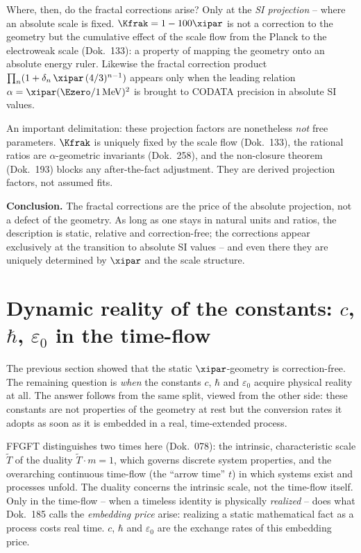 Where, then, do the fractal corrections arise? Only at the \emph{SI projection} --
where an absolute scale is fixed. $\Kfrak=1-100\xipar$ is not a correction to the
geometry but the cumulative effect of the scale flow from the Planck to the
electroweak scale (Dok.~133): a property of mapping the geometry onto an absolute
energy ruler. Likewise the fractal correction product
$\prod_n(1+\delta_n\,\xipar\,(4/3)^{n-1})$ appears only when the leading relation
$\alpha=\xipar(\Ezero/1\,\mathrm{MeV})^2$ is brought to CODATA precision in absolute
SI values.

An important delimitation: these projection factors are nonetheless \emph{not}
free parameters. $\Kfrak$ is uniquely fixed by the scale flow (Dok.~133), the
rational ratios are $\alpha$-geometric invariants (Dok.~258), and the non-closure
theorem (Dok.~193) blocks any after-the-fact adjustment. They are derived
projection factors, not assumed fits.

\begin{result}
\textbf{Conclusion.} The fractal corrections are the price of the absolute
projection, not a defect of the geometry. As long as one stays in natural units
and ratios, the description is static, relative and correction-free; the
corrections appear exclusively at the transition to absolute SI values -- and even
there they are uniquely determined by $\xipar$ and the scale structure.
\end{result}

\section{Dynamic reality of the constants: $c$, $\hbar$, $\varepsilon_0$ in the time-flow}
\label{sec:dyn-konstanten}

The previous section showed that the static $\xipar$-geometry is correction-free.
The remaining question is \emph{when} the constants $c$, $\hbar$ and
$\varepsilon_0$ acquire physical reality at all. The answer follows from the same
split, viewed from the other side: these constants are not properties of the
geometry at rest but the conversion rates it adopts as soon as it is embedded in a
real, time-extended process.

FFGFT distinguishes two times here (Dok.~078): the intrinsic, characteristic scale
$\tilde T$ of the duality $\tilde T\cdot m=1$, which governs discrete system
properties, and the overarching continuous time-flow (the ``arrow time'' $t$) in
which systems exist and processes unfold. The duality concerns the intrinsic
scale, not the time-flow itself. Only in the time-flow -- when a timeless identity
is physically \emph{realized} -- does what Dok.~185 calls the \emph{embedding
price} arise: realizing a static mathematical fact as a process costs real time.
$c$, $\hbar$ and $\varepsilon_0$ are the exchange rates of this embedding price.

